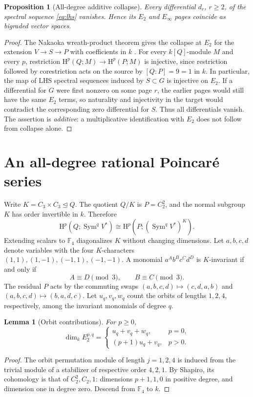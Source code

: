 \documentclass[11pt,a4paper]{article}
\newtheorem{lemma}[theorem]{Lemma}
\newtheorem{proposition}[theorem]{Proposition}
\theoremstyle{remark}\newtheorem{remark}[theorem]{Remark}
\newcommand{\F}{\mathbb F}
\newcommand{\HH}{\mathrm H}
\newcommand{\Sym}{\operatorname{Sym}}
\begin{document}
\begin{proposition}[All-degree additive collapse]\label{prop:collapse}
Every differential \(d_r\), \(r\ge2\), of the spectral sequence \eqref{eq:lhs} vanishes. Hence its \(E_2\) and \(E_\infty\) pages coincide as bigraded vector spaces.
\end{proposition}
\begin{proof}
The Nakaoka wreath-product theorem gives the collapse at \(E_2\) for the extension \(V\to S\to P\) with coefficients in \(k\) \cite{nakaoka,cts}. For every \(k[Q]\)-module \(M\) and every \(p\), restriction \(\HH^p(Q;M)\to\HH^p(P;M)\) is injective, since restriction followed by corestriction acts on the source by \([Q:P]=9=1\) in \(k\). In particular, the map of LHS spectral sequences induced by \(S\subset G\) is injective on \(E_2\). If a differential for \(G\) were first nonzero on some page \(r\), the earlier pages would still have the same \(E_2\) terms, so naturality and injectivity in the target would contradict the corresponding zero differential for \(S\). Thus all differentials vanish. The assertion is \emph{additive}: a multiplicative identification with \(E_2\) does not follow from collapse alone.
\end{proof}

\section{An all-degree rational Poincar\'e series}\label{sec:series}
Write \(K=C_3\times C_3\trianglelefteq Q\). The quotient \(Q/K\) is \(P=C_2^2\), and the normal subgroup \(K\) has order invertible in \(k\). Therefore
\[\HH^p(Q;\Sym^q V^*)\cong\HH^p(P;(\Sym^qV^*)^K).\]
Extending scalars to \(\F_4\) diagonalizes \(K\) without changing dimensions. Let \(a,b,c,d\) denote variables with the four \(K\)-characters \((1,1),(1,-1),(-1,1),(-1,-1)\). A monomial \(a^A b^B c^C d^D\) is \(K\)-invariant if and only if
\begin{equation}\label{eq:monomial-condition}
A\equiv D\pmod3,\qquad B\equiv C\pmod3.
\end{equation}
The residual \(P\) acts by the commuting swaps \((a,b,c,d)\mapsto(c,d,a,b)\) and \((a,b,c,d)\mapsto(b,a,d,c)\). Let \(u_q,v_q,w_q\) count the orbits of lengths \(1,2,4\), respectively, among the invariant monomials of degree \(q\).

\begin{lemma}[Orbit contributions]\label{lem:shapiro-dims}
For \(p\ge0\),
\[
\dim_k E_2^{p,q}=\begin{cases}
 u_q+v_q+w_q,&p=0,\\
 (p+1)u_q+v_q,&p>0.
\end{cases}
\]
\end{lemma}
\begin{proof}
The orbit permutation module of length \(j=1,2,4\) is induced from the trivial module of a stabilizer of respective order \(4,2,1\). By Shapiro, its cohomology is that of \(C_2^2,C_2,1\): dimensions \(p+1,1,0\) in positive degree, and dimension one in degree zero. Descend from \(\F_4\) to \(k\).
\end{proof}
\end{document}
